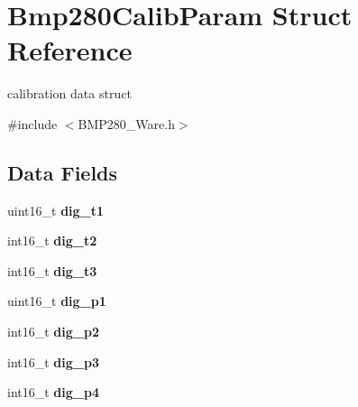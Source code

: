 \hypertarget{structBmp280CalibParam}{}\section{Bmp280\+Calib\+Param Struct Reference}
\label{structBmp280CalibParam}


calibration data struct  




{\ttfamily \#include $<$B\+M\+P280\+\_\+\+Ware.\+h$>$}

\subsection*{Data Fields}
\begin{DoxyCompactItemize}
\item 
\mbox{\label{structBmp280CalibParam_af0f31d919328127b19afc10185575f03}} 
uint16\+\_\+t {\bfseries dig\+\_\+t1}
\item 
\mbox{\label{structBmp280CalibParam_a8dc60a38b57224e2917436127b3f42d3}} 
int16\+\_\+t {\bfseries dig\+\_\+t2}
\item 
\mbox{\label{structBmp280CalibParam_aac8e49eec584c4097c805574ca02faa4}} 
int16\+\_\+t {\bfseries dig\+\_\+t3}
\item 
\mbox{\label{structBmp280CalibParam_a71a393a6e1285904df415ea278c43c19}} 
uint16\+\_\+t {\bfseries dig\+\_\+p1}
\item 
\mbox{\label{structBmp280CalibParam_adeb9748540681fc42690052938b1bf96}} 
int16\+\_\+t {\bfseries dig\+\_\+p2}
\item 
\mbox{\label{structBmp280CalibParam_a08160ac14aa2c9fe485f6a40db273452}} 
int16\+\_\+t {\bfseries dig\+\_\+p3}
\item 
\mbox{\label{structBmp280CalibParam_ab5c947d981b18daf5ecf0c5419a0cd50}} 
int16\+\_\+t {\bfseries dig\+\_\+p4}
\item 
\mbox{\label{structBmp280CalibParam_aa50f166ca650f984b80eb28df8edcd7b}} 

\end{DoxyCompactItemize}
